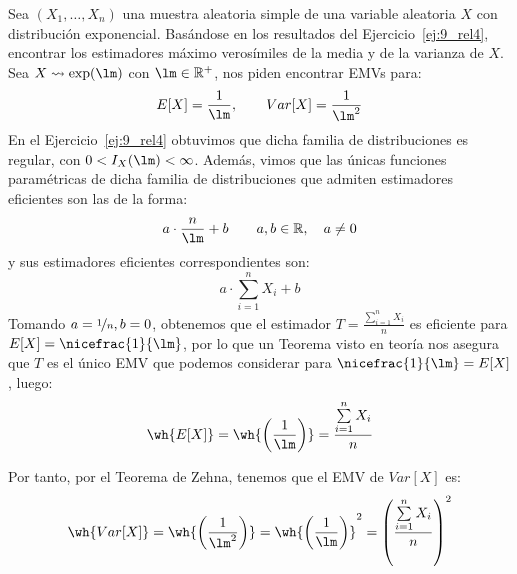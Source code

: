 \begin{ejercicio}
    Sea $(X_1, \ldots, X_n)$ una muestra aleatoria simple de una variable aleatoria $X$ con distribución exponencial. Basándose en los resultados del Ejercicio~\ref{ej:9_rel4}, encontrar los estimadores máximo verosímiles de la media y de la varianza de $X$.\\

    \noindent
    Sea $X\rightsquigarrow \exp(\lm)$ con $\lm\in \mathbb{R}^+$, nos piden encontrar EMVs para:
    \begin{equation*}
        E[X] = \frac{1}{\lm}, \qquad Var[X] = \frac{1}{\lm^2}
    \end{equation*}
    En el Ejercicio~\ref{ej:9_rel4} obtuvimos que dicha familia de distribuciones es regular, con $0<I_X(\lm)< \infty$. Además, vimos que las únicas funciones paramétricas de dicha familia de distribuciones que admiten estimadores eficientes son las de la forma:
    \begin{equation*}
        a\cdot \frac{n}{\lm} +b \qquad a,b\in \mathbb{R}, \quad a\neq 0
    \end{equation*}
    y sus estimadores eficientes correspondientes son:
    \begin{equation*}
        a\cdot \sum_{i=1}^{n}X_i + b
    \end{equation*}
    Tomando $a=\nicefrac{1}{n}, b=0$, obtenemos que el estimador $T=\frac{\sum\limits_{i=1}^nX_i}{n}$ es eficiente para $E[X] = \nicefrac{1}{\lm}$, por lo que un Teorema visto en teoría nos asegura que $T$ es el único EMV que podemos considerar para $\nicefrac{1}{\lm}= E[X]$, luego:
    \begin{equation*}
        \wh{E[X]} = \wh{\left(\frac{1}{\lm}\right)} = \frac{\sum\limits_{i=1}^n X_i}{n}
    \end{equation*}


    Por tanto, por el Teorema de Zehna, tenemos que el EMV de $Var[X]$ es:
    \begin{equation*}
        \wh{Var[X]} = \wh{\left(\frac{1}{\lm^2}\right)} = \wh{\left(\frac{1}{\lm}\right)}^2 = \left(\frac{\sum\limits_{i=1}^n X_i}{n}\right)^2
    \end{equation*}
    
\end{ejercicio}

